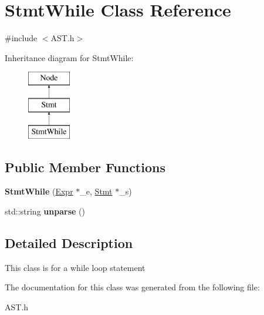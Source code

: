 \hypertarget{classStmtWhile}{\section{Stmt\-While Class Reference}
\label{classStmtWhile}
}


{\ttfamily \#include $<$A\-S\-T.\-h$>$}

Inheritance diagram for Stmt\-While\-:\begin{figure}[H]
\begin{center}
\leavevmode
\includegraphics[height=3.000000cm]{classStmtWhile}
\end{center}
\end{figure}
\subsection*{Public Member Functions}
\begin{DoxyCompactItemize}
\item 
\hypertarget{classStmtWhile_a022ea802e57d9de4d664cfd0a97ffcb4}{{\bfseries Stmt\-While} (\hyperlink{classExpr}{Expr} $\ast$\-\_\-e, \hyperlink{classStmt}{Stmt} $\ast$\-\_\-s)}\label{classStmtWhile_a022ea802e57d9de4d664cfd0a97ffcb4}

\item 
\hypertarget{classStmtWhile_a832f826fc3a07af5fb82407bf60ba5ce}{std\-::string {\bfseries unparse} ()}\label{classStmtWhile_a832f826fc3a07af5fb82407bf60ba5ce}

\end{DoxyCompactItemize}


\subsection{Detailed Description}
This class is for a while loop statement 

The documentation for this class was generated from the following file\-:\begin{DoxyCompactItemize}
\item 
A\-S\-T.\-h\end{DoxyCompactItemize}
